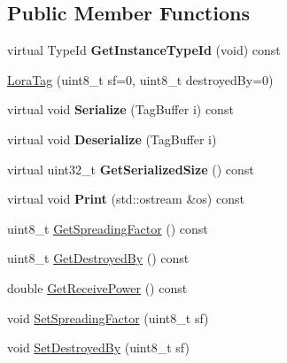 \subsection*{Public Member Functions}
\begin{DoxyCompactItemize}
\item 
\mbox{\label{classns3_1_1lorawan_1_1LoraTag_a2d82713e3dd081bea0595a5363eb36f4}} 
virtual Type\+Id {\bfseries Get\+Instance\+Type\+Id} (void) const
\item 
\hyperlink{classns3_1_1lorawan_1_1LoraTag_ab431ca942a24ff3f58edca2ca790a525}{Lora\+Tag} (uint8\+\_\+t sf=0, uint8\+\_\+t destroyed\+By=0)
\item 
\mbox{\label{classns3_1_1lorawan_1_1LoraTag_a601c30f1afe11ee9b444601b987069b8}} 
virtual void {\bfseries Serialize} (Tag\+Buffer i) const
\item 
\mbox{\label{classns3_1_1lorawan_1_1LoraTag_adcf3b70b607aa93db67fb14e352e7bca}} 
virtual void {\bfseries Deserialize} (Tag\+Buffer i)
\item 
\mbox{\label{classns3_1_1lorawan_1_1LoraTag_a25c0d8b5599db0a4afc25324cfb32d11}} 
virtual uint32\+\_\+t {\bfseries Get\+Serialized\+Size} () const
\item 
\mbox{\label{classns3_1_1lorawan_1_1LoraTag_a6f04453d53c9a5c204484dd46db4844b}} 
virtual void {\bfseries Print} (std\+::ostream \&os) const
\item 
uint8\+\_\+t \hyperlink{classns3_1_1lorawan_1_1LoraTag_aacab2442951ecde87e08047bead0e317}{Get\+Spreading\+Factor} () const
\item 
uint8\+\_\+t \hyperlink{classns3_1_1lorawan_1_1LoraTag_a40689221c88be9ac02b847c131e7b755}{Get\+Destroyed\+By} () const
\item 
double \hyperlink{classns3_1_1lorawan_1_1LoraTag_a956ea65aa29bb932888d0f8e6cf2f7db}{Get\+Receive\+Power} () const
\item 
void \hyperlink{classns3_1_1lorawan_1_1LoraTag_a7afef6f80d53d33748c4fd34a9df6e3e}{Set\+Spreading\+Factor} (uint8\+\_\+t sf)
\item 
void \hyperlink{classns3_1_1lorawan_1_1LoraTag_ad420b4023f8ddeb1b7ea8d63255a718d}{Set\+Destroyed\+By} (uint8\+\_\+t sf)

\end{DoxyCompactItemize}
